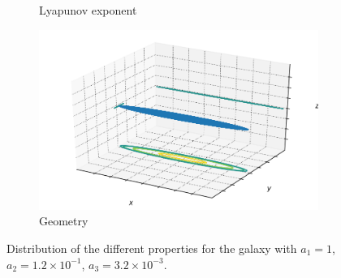 \begin{figure}[h]
\begin{subfigure}[t]{0.4\textwidth}
        \caption{Lyapunov exponent}
    \end{subfigure}
    \begin{subfigure}[t]{0.4\textwidth}
        \includegraphics[width=\textwidth]{"../Files/Week 13/images/18_ellipsoid"}
        \caption{Geometry}
    \end{subfigure}
    \caption{Distribution of the different properties for the galaxy with $a_1 = 1$, $a_2 = 1.2\times10^{-1}$, $a_3 = 3.2\times10^{-3}$.}
\end{figure}


